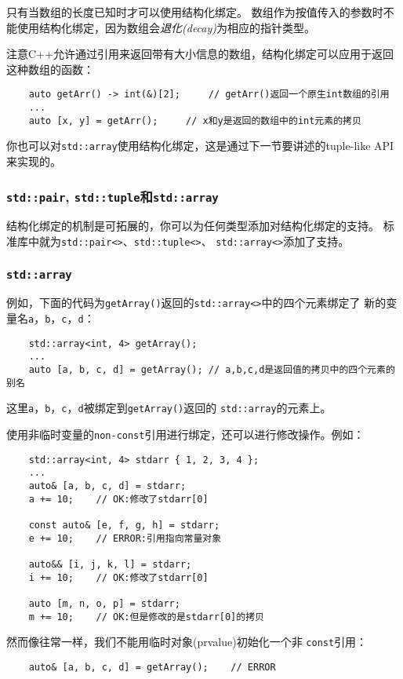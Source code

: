 只有当数组的长度已知时才可以使用结构化绑定。
数组作为按值传入的参数时不能使用结构化绑定，因为数组会\emph{退化(decay)}为相应的指针类型。

注意C++允许通过引用来返回带有大小信息的数组，结构化绑定可以应用于返回这种数组的函数：
\begin{lstlisting}
    auto getArr() -> int(&)[2];     // getArr()返回一个原生int数组的引用
    ...
    auto [x, y] = getArr();     // x和y是返回的数组中的int元素的拷贝
\end{lstlisting}
你也可以对\texttt{std::array}使用结构化绑定，这是通过下一节要讲述的tuple-like API来实现的。

\subsubsection{\texttt{std::pair}, \texttt{std::tuple}和\texttt{std::array}}
结构化绑定的机制是可拓展的，你可以为任何类型添加对结构化绑定的支持。
标准库中就为\texttt{std::pair<>}、\texttt{std::tuple<>}、
\texttt{std::array<>}添加了支持。

\subsubsection*{\texttt{std::array}}
例如，下面的代码为\texttt{getArray()}返回的\texttt{std::array<>}中的四个元素绑定了
新的变量名\texttt{a}，\texttt{b}，\texttt{c}，\texttt{d}：
\begin{lstlisting}
    std::array<int, 4> getArray();
    ...
    auto [a, b, c, d] = getArray(); // a,b,c,d是返回值的拷贝中的四个元素的别名
\end{lstlisting}
这里\texttt{a}，\texttt{b}，\texttt{c}，\texttt{d}被绑定到\texttt{getArray()}返回的
\texttt{std::array}的元素上。

使用非临时变量的\texttt{non-const}引用进行绑定，还可以进行修改操作。例如：
\begin{lstlisting}
    std::array<int, 4> stdarr { 1, 2, 3, 4 };
    ...
    auto& [a, b, c, d] = stdarr;
    a += 10;    // OK:修改了stdarr[0]

    const auto& [e, f, g, h] = stdarr;
    e += 10;    // ERROR:引用指向常量对象

    auto&& [i, j, k, l] = stdarr;
    i += 10;    // OK:修改了stdarr[0]

    auto [m, n, o, p] = stdarr;
    m += 10;    // OK:但是修改的是stdarr[0]的拷贝
\end{lstlisting}
然而像往常一样，我们不能用临时对象(prvalue)初始化一个非 \texttt{const}引用：
\begin{lstlisting}
    auto& [a, b, c, d] = getArray();    // ERROR
\end{lstlisting}

